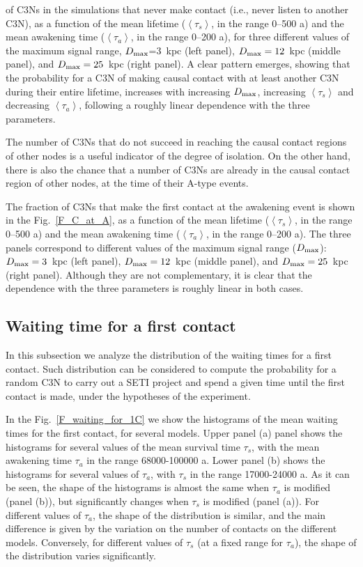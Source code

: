 \documentclass[crop]{CSLB}
\newcommand{\ceti}{C3N}
\newcommand{\cetis}{C3Ns}
\newcommand{\ffn}[1]{}
\begin{document}
of \cetis{} in the simulations that never make contact (i.e., never
listen to another \ceti{}), as a function of the mean lifetime
($\left<\tau_s\right>$, in the range 0--500 a) and the mean awakening
time ($\left<\tau_a\right>$, in the range 0--200 a), for three
different values of the maximum signal range, $D_{\rm max}$=3~kpc (left
panel), $D_{\rm max}=12$~kpc (middle panel), and $D_{\rm max}=25$~kpc
(right panel).
%
A clear pattern emerges, showing that the probability
for a \ceti{} of making causal contact with at least another \ceti{}
during their entire lifetime, increases with increasing $D_{\rm max}$,
increasing $\left<\tau_s\right>$ and decreasing $\left<\tau_a\right>$,
following a roughly linear dependence with the three parameters.


The number of \cetis{} that do not succeed in reaching the
causal contact regions of other nodes is a useful indicator of
the
degree of isolation.
%
On the other hand, there is also the chance that a number of
\cetis{} are already in the causal contact region of other nodes,
at the time of their A-type events.
%
\ffn{5}
%
The fraction of \cetis{} that make the first contact at the awakening
event is shown in the Fig.~\ref{F_C_at_A}, 
as a function of the mean lifetime
($\left<\tau_s\right>$, in the range 0--500 a) and the mean awakening
time ($\left<\tau_a\right>$, in the range 0--200 a).
%
The three panels correspond to different values of the maximum signal
range ($D_{\rm max}$):
%
$D_{\rm max}=3$~kpc (left
panel), $D_{\rm max}=12$~kpc (middle panel), and $D_{\rm max}=25$~kpc
(right panel).
%
Although they are not complementary, it is clear that the dependence
with the three parameters is roughly linear in both cases.
%


\subsection{Waiting time for a first contact}\label{SS_waiting}

In this subsection we analyze the distribution of the waiting times for
a first contact.
%
Such distribution can be considered to compute the probability for a
random \ceti{} to carry out a SETI project and spend a given time until
the first contact is made, under the hypotheses of the experiment.
%
\ffn{6}
%
In the Fig.~\ref{F_waiting_for_1C} we show the histograms of the mean
waiting times for the first contact, for several models.
%
Upper panel (a) panel shows the histograms for several values of the
mean survival time $\tau_s$, with the mean awakening time $\tau_a$ in
the range 68000-100000 a.
%
Lower panel (b) shows the histograms for several values of $\tau_a$,
with $\tau_s$ in the range 17000-24000 a.
%
As it can be seen, the shape of the histograms is almost the same when
$\tau_a$ is modified (panel (b)), but significantly changes when
$\tau_s$ is modified (panel (a)). 
%
For different values of $\tau_a$, the shape of the distribution is
similar, and the main difference is given by the variation on the number of
contacts on the different models.
%
Conversely, for different values of $\tau_s$ (at a fixed range for
$\tau_a$), the shape of the
distribution varies significantly.
\end{document}
